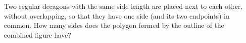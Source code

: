 Two regular decagons with the same side length are placed next to each other, without overlapping, so that they have one side (and its two endpoints) in common. How many sides does the polygon formed by the outline of the combined figure have?
